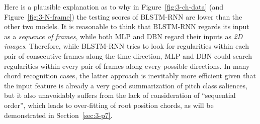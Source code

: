 Here is a plausible explanation as to why in Figure~\ref{fig:3-ch-data} (and Figure~\ref{fig:3-N-frame}) the testing scores of BLSTM-RNN are lower than the other two models. It is reasonable to think that BLSTM-RNN regards its input as a {\it sequence of frames}, while both MLP and DBN regard their inputs as \textit{2D images}. Therefore, while BLSTM-RNN tries to look for regularities within each pair of consecutive frames along the time direction, MLP and DBN could search regularities within every pair of frames along every possible directions. In many chord recognition cases, the latter approach is inevitably more efficient given that the input feature is already a very good summarization of pitch class saliences, but it also unavoidably suffers from the lack of consideration of ``sequential order'', which leads to over-fitting of root position chords, as will be demonstrated in Section~\ref{sec:3-p7}.
